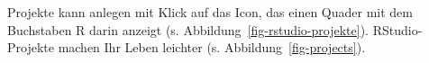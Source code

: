 \documentclass[
  a4paper,
  DIV=11]{scrreprt}
\theoremstyle{definition}
\theoremstyle{definition}
\theoremstyle{definition}
\theoremstyle{remark}
\begin{document}
Projekte kann anlegen mit Klick auf das Icon, das einen Quader mit dem
Buchstaben R darin anzeigt (s. Abbildung~\ref{fig-rstudio-projekte}).
RStudio-Projekte machen Ihr Leben leichter (s.
Abbildung~\ref{fig-projects}).

\begin{figure}

\begin{minipage}{0.50\linewidth}



\end{minipage}%
%
\begin{minipage}{0.50\linewidth}

\end{minipage}
\end{figure}
\end{document}
